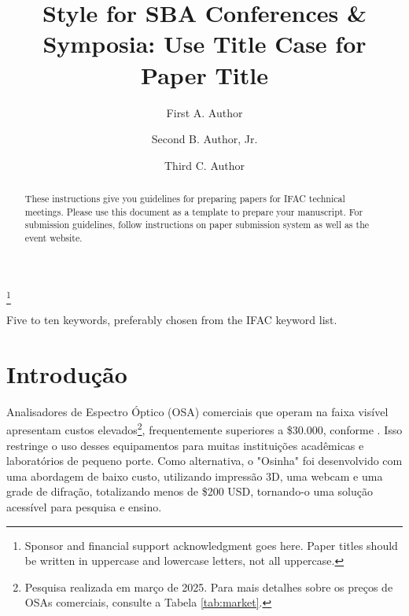\documentclass[a4paper]{ifacconf}
\begin{document}
\begin{frontmatter}

\title{Style for SBA Conferences \& Symposia: Use Title Case for
  Paper Title} 

\thanks[footnoteinfo]{Sponsor and financial support acknowledgment
goes here. Paper titles should be written in uppercase and lowercase
letters, not all uppercase.}

\author[First]{First A. Author} 
\author[Second]{Second B. Author, Jr.} 
\author[Third]{Third C. Author}


\address[First]{Faculdade de Engenharia Elétrica, Universidade do Triângulo, MG, (e-mail: autor1@faceg@univt.br).}
\address[Second]{Faculdade de Engenharia de Controle \& Automação, Universidade do Futuro, RJ (e-mail: autor2@feca.unifutu.rj)}
\address[Third]{Electrical Engineering Department, 
   Seoul National University, Seoul, Korea, (e-mail: author3@snu.ac.kr)}
   
\renewcommand{\abstractname}{{\bf Abstract:~}}   
   
\begin{abstract}                %
These instructions give you guidelines for preparing papers for IFAC
technical meetings. Please use this document as a template to prepare
your manuscript. For submission guidelines, follow instructions on
paper submission system as well as the event website.
\end{abstract}

\begin{keyword}
Five to ten keywords, preferably chosen from the IFAC keyword list.
\end{keyword}

\end{frontmatter}
\fi



\section{Introdução}

Analisadores de Espectro Óptico (OSA) comerciais que operam na faixa visível apresentam custos elevados\footnote{Pesquisa realizada em março de 2025. Para mais detalhes sobre os preços de OSAs comerciais, consulte a Tabela \ref{tab:market}.}, frequentemente superiores a \$30.000, conforme \cite{OSA201C}. Isso restringe o uso desses equipamentos para muitas instituições acadêmicas e laboratórios de pequeno porte. Como alternativa, o "Osinha" foi desenvolvido com uma abordagem de baixo custo, utilizando impressão 3D, uma webcam e uma grade de difração, totalizando menos de \$200 USD, tornando-o uma solução acessível para pesquisa e ensino.
\end{document}
